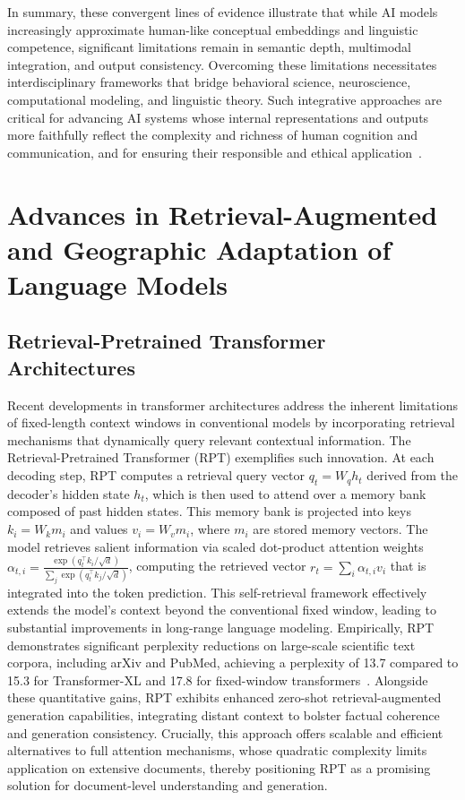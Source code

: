 \documentclass[sigconf]{acmart}
\begin{document}
In summary, these convergent lines of evidence illustrate that while AI models increasingly approximate human-like conceptual embeddings and linguistic competence, significant limitations remain in semantic depth, multimodal integration, and output consistency. Overcoming these limitations necessitates interdisciplinary frameworks that bridge behavioral science, neuroscience, computational modeling, and linguistic theory. Such integrative approaches are critical for advancing AI systems whose internal representations and outputs more faithfully reflect the complexity and richness of human cognition and communication, and for ensuring their responsible and ethical application~\cite{ref2,ref4,ref5,ref34,ref35}.

\section{Advances in Retrieval-Augmented and Geographic Adaptation of Language Models}

\subsection{Retrieval-Pretrained Transformer Architectures}

Recent developments in transformer architectures address the inherent limitations of fixed-length context windows in conventional models by incorporating retrieval mechanisms that dynamically query relevant contextual information. The Retrieval-Pretrained Transformer (RPT) exemplifies such innovation. At each decoding step, RPT computes a retrieval query vector \( q_t = W_q h_t \) derived from the decoder’s hidden state \( h_t \), which is then used to attend over a memory bank composed of past hidden states. This memory bank is projected into keys \( k_i = W_k m_i \) and values \( v_i = W_v m_i \), where \( m_i \) are stored memory vectors. The model retrieves salient information via scaled dot-product attention weights \(\alpha_{t,i} = \frac{\exp(q_t^\top k_i / \sqrt{d})}{\sum_j \exp(q_t^\top k_j / \sqrt{d})}\), computing the retrieved vector \( r_t = \sum_i \alpha_{t,i} v_i \) that is integrated into the token prediction. This self-retrieval framework effectively extends the model’s context beyond the conventional fixed window, leading to substantial improvements in long-range language modeling. Empirically, RPT demonstrates significant perplexity reductions on large-scale scientific text corpora, including arXiv and PubMed, achieving a perplexity of 13.7 compared to 15.3 for Transformer-XL and 17.8 for fixed-window transformers~\cite{ref29}. Alongside these quantitative gains, RPT exhibits enhanced zero-shot retrieval-augmented generation capabilities, integrating distant context to bolster factual coherence and generation consistency. Crucially, this approach offers scalable and efficient alternatives to full attention mechanisms, whose quadratic complexity limits application on extensive documents, thereby positioning RPT as a promising solution for document-level understanding and generation.
\end{document}
